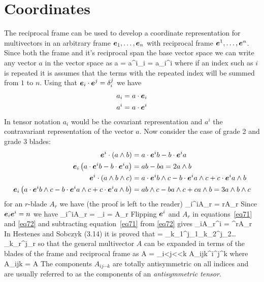 \section{Coordinates}
The reciprocal frame can be used to develop a coordinate representation for multivectors in an arbitrary frame
$\bm{e}_{1},\dots,\bm{e}_{n}$ with reciprocal frame $\bm{e}^{1},\dots,\bm{e}^{n}$.
Since both the frame and it's reciprocal span the base vector space we can write any vector $a$ in the vector space
as
\be
	a = a^{i}\eb_{i} = a_{i}\eb^{i}
\ee
where if an index such as $i$ is repeated it is assumes that the terms with the repeated index will be summed from
$1$ to $n$. Using that $\bm{e}_{i}\cdot\bm{e}^{j} = \delta_{i}^{j}$ we have
\begin{align}
	a_{i} &= a\cdot\bm{e}_{i} \\
	a^{i} &= a\cdot\bm{e}^{i}
\end{align}
In tensor notation $a_{i}$ would be the covariant representation and $a^{i}$ the contravariant representation of the 
vector $a$.  Now consider the case of grade 2 and grade 3 blades:
\begin{align}
	\bm{e}^{i}\cdot\left ( {a\wedge b} \right ) &= a\cdot\bm{e}^{i}b-b\cdot\bm{e}^{i}a \nonumber \\
	\bm{e}_{i}\left ( {a\cdot\bm{e}^{i}b-b\cdot\bm{e}^{i}a} \right ) &= ab-ba = 2a\wedge b \nonumber \\
	\bm{e}^{i}\cdot\left ( {a\wedge b\wedge c} \right ) &= a\cdot\bm{e}^{i}b\wedge c-b\cdot\bm{e}^{i}a\wedge c+ c\cdot\bm{e}^{i}a\wedge b \nonumber \\
	\bm{e}_{i}\left ( {a\cdot\bm{e}^{i}b\wedge c-b\cdot\bm{e}^{i}a\wedge c+ c\cdot\bm{e}^{i}a\wedge b} \right ) &= ab\wedge c-ba\wedge c+ca\wedge b = 3a\wedge b\wedge c \nonumber 
\end{align}
for an $r$-blade $A_{r}$ we have (the proof is left to the reader)
\be\label{eq71}
	\eb_{i}\eb^{i}\cdot A_{r} = rA_{r}
\ee
Since $\bm{e}_{i}\bm{e}^{i} = n$ we have
\be\label{eq72}
	\eb_{i}\eb^{i}\w A_{r} = \eb_{i} = A_{r}
\ee
Flipping $\bm{e}^{i}$ and $A_{r}$ in equations~\ref{eq71} and \ref{eq72} and subtracting equation~\ref{eq71}
from \ref{eq72} gives
\be
	\eb_{i}A_{r}\eb^{i} = ^{r}A_{r}
\ee
In Hestenes and Sobczyk (3.14) it is proved that
\be
	\cdot{} =
	\delta_{k_{1}}^{j_{1}}\delta_{k_{2}}^{j_{2}}\dots\delta_{k_{r}}^{j_{r}}
\ee
so that the general multivector $A$ can be expanded in terms of the blades of the frame and reciprocal frame as
\be\label{eq1_75}
	A = \sum_{i<j<\cdots<k} A_{ij\cdots k}\eb^{i}\w\eb^{j}\w\cdots\w\eb^{k}
\ee
where
\be\label{eq1_76}
	A_{ij\cdots k} = \cdot A
\ee
The components $A_{ij\cdots k}$ are totally antisymmetric on all indices and are usually referred to
as the components of an {\em antisymmetric tensor}.

